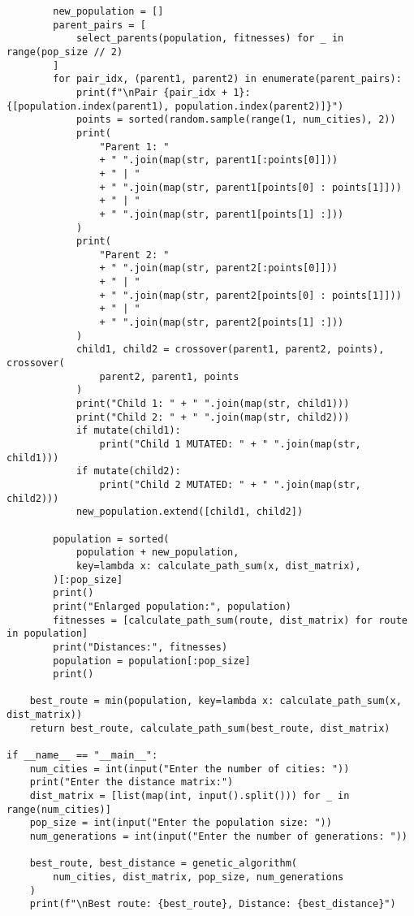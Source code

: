 \begin{lstlisting}
        new_population = []
        parent_pairs = [
            select_parents(population, fitnesses) for _ in range(pop_size // 2)
        ]
        for pair_idx, (parent1, parent2) in enumerate(parent_pairs):
            print(f"\nPair {pair_idx + 1}: {[population.index(parent1), population.index(parent2)]}")
            points = sorted(random.sample(range(1, num_cities), 2))
            print(
                "Parent 1: "
                + " ".join(map(str, parent1[:points[0]]))
                + " | "
                + " ".join(map(str, parent1[points[0] : points[1]]))
                + " | "
                + " ".join(map(str, parent1[points[1] :]))
            )
            print(
                "Parent 2: "
                + " ".join(map(str, parent2[:points[0]]))
                + " | "
                + " ".join(map(str, parent2[points[0] : points[1]]))
                + " | "
                + " ".join(map(str, parent2[points[1] :]))
            )
            child1, child2 = crossover(parent1, parent2, points), crossover(
                parent2, parent1, points
            )
            print("Child 1: " + " ".join(map(str, child1)))
            print("Child 2: " + " ".join(map(str, child2)))
            if mutate(child1):
                print("Child 1 MUTATED: " + " ".join(map(str, child1)))
            if mutate(child2):
                print("Child 2 MUTATED: " + " ".join(map(str, child2)))
            new_population.extend([child1, child2])

        population = sorted(
            population + new_population,
            key=lambda x: calculate_path_sum(x, dist_matrix),
        )[:pop_size]
        print()
        print("Enlarged population:", population)
        fitnesses = [calculate_path_sum(route, dist_matrix) for route in population]
        print("Distances:", fitnesses)
        population = population[:pop_size]
        print()

    best_route = min(population, key=lambda x: calculate_path_sum(x, dist_matrix))
    return best_route, calculate_path_sum(best_route, dist_matrix)

if __name__ == "__main__":
    num_cities = int(input("Enter the number of cities: "))
    print("Enter the distance matrix:")
    dist_matrix = [list(map(int, input().split())) for _ in range(num_cities)]
    pop_size = int(input("Enter the population size: "))
    num_generations = int(input("Enter the number of generations: "))

    best_route, best_distance = genetic_algorithm(
        num_cities, dist_matrix, pop_size, num_generations
    )
    print(f"\nBest route: {best_route}, Distance: {best_distance}")
\end{lstlisting}

